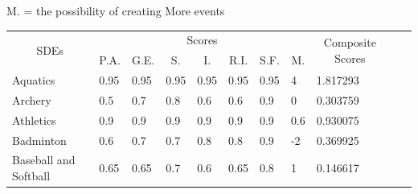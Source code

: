 \documentclass[a4paper]{article}
\begin{document}
M. = the possibility of creating More events
\begin{table}[h]
    \begin{tabular}{|l|lllllll|l|ll}
    \cline{1-9}
    \multicolumn{1}{|c|}{\multirow{2}{*}{SDEs}} & \multicolumn{7}{c|}{Scores}                                                                                                                                                                                 & \multicolumn{1}{c|}{\multirow{2}{*}{Composite Scores}} &  &  \\ \cline{2-8}
    \multicolumn{1}{|c|}{}                      & \multicolumn{1}{c|}{P.A.}     & \multicolumn{1}{c|}{G.E.}     & \multicolumn{1}{c|}{S.}   & \multicolumn{1}{c|}{I.}   & \multicolumn{1}{c|}{R.I.} & \multicolumn{1}{c|}{S.F.}     & \multicolumn{1}{c|}{M.} & \multicolumn{1}{c|}{}                                  &  &  \\ \cline{1-9}
    Aquatics                                    & \multicolumn{1}{l|}{0.95}     & \multicolumn{1}{l|}{0.95}     & \multicolumn{1}{l|}{0.95} & \multicolumn{1}{l|}{0.95} & \multicolumn{1}{l|}{0.95} & \multicolumn{1}{l|}{0.95}     & 4                       & 1.817293                                               &  &  \\ \cline{1-9}
    Archery                                     & \multicolumn{1}{l|}{0.5}      & \multicolumn{1}{l|}{0.7}      & \multicolumn{1}{l|}{0.8}  & \multicolumn{1}{l|}{0.6}  & \multicolumn{1}{l|}{0.6}  & \multicolumn{1}{l|}{0.9}      & 0                       & 0.303759                                               &  &  \\ \cline{1-9}
    Athletics                                   & \multicolumn{1}{l|}{0.9}      & \multicolumn{1}{l|}{0.9}      & \multicolumn{1}{l|}{0.9}  & \multicolumn{1}{l|}{0.9}  & \multicolumn{1}{l|}{0.9}  & \multicolumn{1}{l|}{0.9}      & 0.6                     & 0.930075                                               &  &  \\ \cline{1-9}
    Badminton                                   & \multicolumn{1}{l|}{0.6}      & \multicolumn{1}{l|}{0.7}      & \multicolumn{1}{l|}{0.7}  & \multicolumn{1}{l|}{0.8}  & \multicolumn{1}{l|}{0.8}  & \multicolumn{1}{l|}{0.9}      & -2                      & 0.369925                                               &  &  \\ \cline{1-9}
    Baseball and Softball                       & \multicolumn{1}{l|}{0.65}     & \multicolumn{1}{l|}{0.65}     & \multicolumn{1}{l|}{0.7}  & \multicolumn{1}{l|}{0.6}  & \multicolumn{1}{l|}{0.65} & \multicolumn{1}{l|}{0.8}      & 1                       & 0.146617                                               &  &  \\ \cline{1-9}

\end{tabular}
\end{table}
\end{document}
